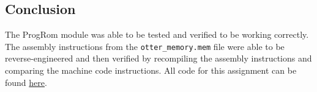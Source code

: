 \documentclass[
    a4paper, %
	12pt, %
    ]{CSSullivanBusinessReport}
\begin{document}
\begin{fullwidth}
\section {Conclusion} %
\hypersetup{urlcolor=blue} 
The ProgRom module was able to be tested and verified to be working correctly. The assembly instructions from the \verb|otter_memory.mem| file were able to be reverse-engineered and then verified by recompiling the assembly instructions and comparing the machine code instructions.
All code for this assignment can be found \href{https://github.com/EthanV1920/CPE-233-Otter/tree/main}{here}.


\end{fullwidth}



\end{document}
